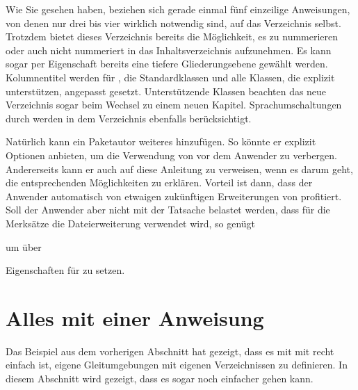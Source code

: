 Wie Sie gesehen haben, beziehen sich gerade einmal fünf einzeilige
Anweisungen, von denen nur drei bis vier wirklich notwendig sind, auf das
Verzeichnis selbst. Trotzdem bietet dieses Verzeichnis bereits die
Möglichkeit, es zu nummerieren oder auch nicht nummeriert in das
Inhaltsverzeichnis aufzunehmen. Es kann sogar per Eigenschaft bereits eine
tiefere Gliederungsebene gewählt werden. Kolumnentitel werden für \KOMAScript,
die Standardklassen und alle Klassen, die  explizit
unterstützen, angepasst gesetzt. Unterstützende Klassen beachten das neue
Verzeichnis sogar beim Wechsel zu einem neuen Kapitel. Sprachumschaltungen
durch  werden in dem Verzeichnis ebenfalls berücksichtigt.

Natürlich kann ein Paketautor weiteres
hinzufügen. So könnte er explizit Optionen anbieten, um die Verwendung von
 vor dem Anwender zu verbergen. Andererseits
kann er auch auf diese Anleitung zu  verweisen, wenn es
darum geht, die entsprechenden Möglichkeiten zu erklären. Vorteil ist dann,
dass der Anwender automatisch von etwaigen zukünftigen Erweiterungen von
 profitiert. Soll der Anwender aber nicht mit der Tatsache
belastet werden, dass für die Merksätze die Dateierweiterung 
verwendet wird, so genügt
\begin{lstcode}
  \newcommand*{\setupremarkboxes}{\setuptoc{lor}}
\end{lstcode}
\iffalse%
um eine als Argument an \Macro{setupremarkboxes} übergebene Liste von
Eigenschaften direkt als Liste von %
\else%
um über 
\fi
Eigenschaften für  zu setzen.


\section{Alles mit einer Anweisung}

Das Beispiel aus dem vorherigen Abschnitt hat gezeigt, dass es mit mit
 recht einfach ist, eigene Gleitumgebungen mit eigenen
Verzeichnissen zu definieren. In diesem Abschnitt wird gezeigt, dass es sogar
noch einfacher gehen kann.

